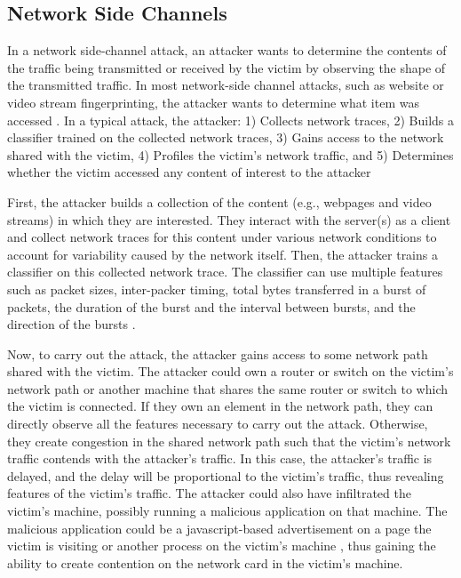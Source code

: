 \subsection{Network Side Channels}
\label{subsec:netshaper-background-network-side-channels}

In a network side-channel attack, an attacker wants to determine the contents of the traffic being transmitted or received by the victim by observing the shape of the transmitted traffic.
In most network-side channel attacks, such as website or video stream fingerprinting, the attacker wants to determine what item was accessed
\cite{bhat2019varcnn, dyer2012peek, hayes2016kfp, sirinam2018df, schuster2017beautyburst}.
In a typical attack, the attacker:
1) Collects network traces,
2) Builds a classifier trained on the collected network traces,
3) Gains access to the network shared with the victim,
4) Profiles the victim's network traffic, and
5) Determines whether the victim accessed any content of interest to the attacker

First, the attacker builds a collection of the content (e.g., webpages and video streams) in which they are interested. 
They interact with the server(s) as a client and collect network traces for this content under various network conditions to account for variability caused by the network itself. 
Then, the attacker trains a classifier on this collected network trace.
The classifier can use multiple features such as packet sizes, inter-packer timing, total bytes transferred in a burst of packets, the duration of the burst and the interval between bursts, and the direction of the bursts \cite{schuster2017beautyburst}.

Now, to carry out the attack, the attacker gains access to some network path shared with the victim.
The attacker could own a router or switch on the victim's network path or another machine that shares the same router or switch to which the victim is connected.
If they own an element in the network path, they can directly observe all the features necessary to carry out the attack. 
Otherwise, they create congestion in the shared network path such that the victim's network traffic contends with the attacker's traffic.
In this case, the attacker's traffic is delayed, and the delay will be proportional to the victim's traffic, thus revealing features of the victim's traffic.
The attacker could also have infiltrated the victim's machine, possibly running a malicious application on that machine.
The malicious application could be a javascript-based advertisement on a page the victim is visiting or another process on the victim's machine \cite{schuster2017beautyburst}, thus gaining the ability to create contention on the network card in the victim's machine. 


